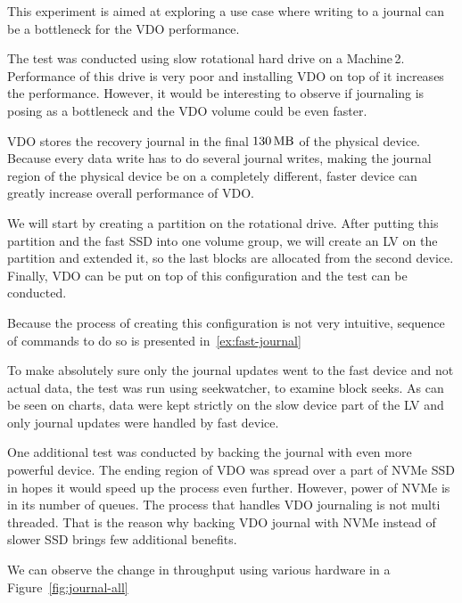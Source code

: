 \documentclass[
  color, %
  table, %
  lof,   %
  lot,   %
]{fithesis3}
\begin{document}
This experiment is aimed at exploring a use case where writing to a journal can be a bottleneck for the VDO performance.

The test was conducted using slow rotational hard drive on a Machine\,2. Performance of this drive is very poor and installing VDO on top of it increases the performance. However, it would be interesting to observe if journaling is posing as a bottleneck and the VDO volume could be even faster.


VDO stores the recovery journal in the final $\SI{130}{\mega\byte}$ of the physical device. Because every data write has to do several journal writes, making the journal region of the physical device be on a completely different, faster device can greatly increase overall performance of VDO.

We will start by creating a partition on the rotational drive. After putting this partition and the fast SSD into one volume group, we will create an LV on the partition and extended it, so the last blocks are allocated from the second device. Finally, VDO can be put on top of this configuration and the test can be conducted.

Because the process of creating this configuration is not very intuitive, sequence of commands to do so is presented in~\ref{ex:fast-journal}

To make absolutely sure only the journal updates went to the fast device and not actual data, the test was run using seekwatcher, to examine block seeks. As can be seen on charts, data were kept strictly on the slow device part of the LV and only journal updates were handled by fast device.

One additional test was conducted by backing the journal with even more powerful device. The ending region of VDO was spread over a part of NVMe SSD in hopes it would speed up the process even further. However, power of NVMe is in its number of queues. The process that handles VDO journaling is not multi threaded. That is the reason why backing VDO journal with NVMe instead of slower SSD brings few additional benefits.

We can observe the change in throughput using various hardware in a Figure~\ref{fig:journal-all}
\end{document}
